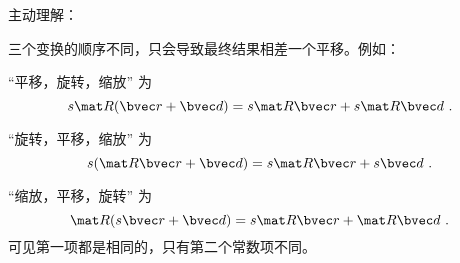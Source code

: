
主动理解：

三个变换的顺序不同，只会导致最终结果相差一个平移。例如：

“平移，旋转，缩放” 为
\begin{equation}
s\mat R (\bvec r + \bvec d) = s\mat R\bvec r + s\mat R\bvec d~.
\end{equation}

“旋转，平移，缩放” 为
\begin{equation}
s(\mat R\bvec r + \bvec d) = s\mat R\bvec r + s\bvec d~.
\end{equation}

“缩放，平移，旋转” 为
\begin{equation}
\mat R(s\bvec r + \bvec d) = s\mat R\bvec r + \mat R\bvec d~.
\end{equation}
可见第一项都是相同的，只有第二个常数项不同。

